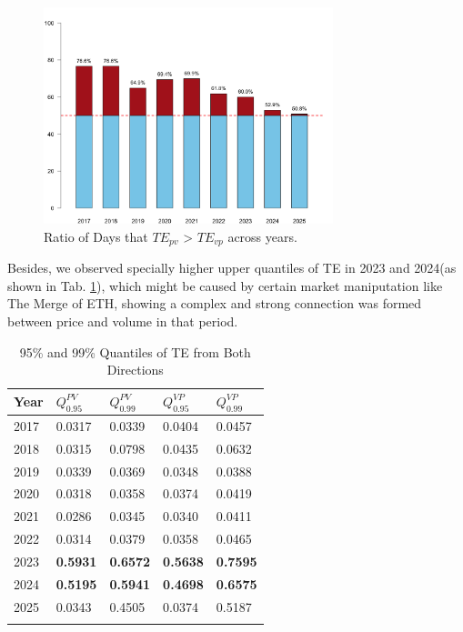 \documentclass{elsarticle}
\def\rightarrow{}%
\begin{document}
\begin{figure}[H]
  \centering
  \includegraphics[width=0.75\textwidth]{imgs/greaterRatio.png}
  \caption{Ratio of Days that $TE_{p \rightarrow v}$ > $TE_{v \rightarrow p}$ across years.}
  \label{fig:TE_CP_daily}
  \end{figure}
Besides, we observed specially higher upper quantiles of TE in 2023 and 2024(as shown in Tab. \ref{tab:te_quantiles}), which might be caused by certain market maniputation like The Merge of ETH, showing a complex and strong connection was formed between price and volume in that period.
\begin{table}[H]
  \caption{95\% and 99\% Quantiles of TE from Both Directions}
  \label{tab:te_quantiles}
  \centering
  \begin{tabular}{lllll}
    \hline\noalign{\smallskip}
    \textbf{Year} & $Q_{0.95}^{P \rightarrow V}$ & $Q_{0.99}^{P \rightarrow V}$ & $Q_{0.95}^{V \rightarrow P}$ & $Q_{0.99}^{V \rightarrow P}$ \\
    \hline\noalign{\smallskip}
    2017 & 0.0317 & 0.0339 & 0.0404 & 0.0457 \\
    2018 & 0.0315 & 0.0798 & 0.0435 & 0.0632 \\
    2019 & 0.0339 & 0.0369 & 0.0348 & 0.0388 \\
    2020 & 0.0318 & 0.0358 & 0.0374 & 0.0419 \\
    2021 & 0.0286 & 0.0345 & 0.0340 & 0.0411 \\
    2022 & 0.0314 & 0.0379 & 0.0358 & 0.0465 \\
    2023 & \textbf{0.5931} & \textbf{0.6572} & \textbf{0.5638} & \textbf{0.7595} \\
    2024 & \textbf{0.5195} & \textbf{0.5941} & \textbf{0.4698} & \textbf{0.6575} \\
    2025 & 0.0343 & 0.4505 & 0.0374 & 0.5187 \\
    \hline\noalign{\smallskip}
  \end{tabular}
\end{table}
\end{document}
